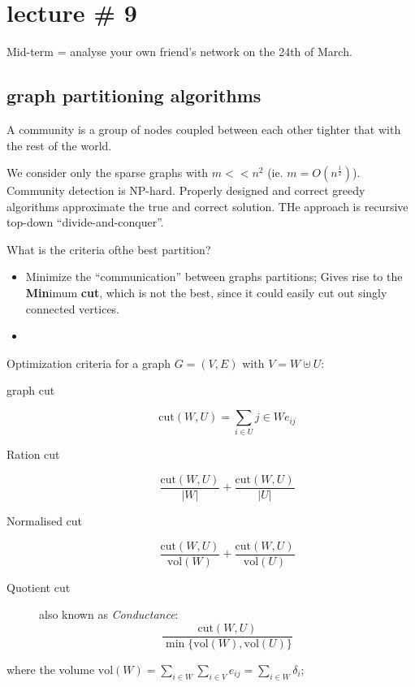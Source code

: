 \documentclass[a4paper]{article}
\begin{document}



\section{lecture \# 9} %
\label{sec:lecture_9}

Mid-term = analyse your own friend's network on the 24th of March.

\subsection{graph partitioning algorithms} %
\label{sub:graph_partitioning_algorithms}

A community is a group of nodes coupled between each other tighter that with the rest of the world.

We consider only the sparse graphs with $m<<n^2$ (ie. $m = O(n^\frac{1}{2})$). Community detection is NP-hard.
Properly designed and correct greedy algorithms approximate the true and correct solution. THe approach is recursive top-down ``divide-and-conquer''.

What is the criteria ofthe best partition?\begin{itemize}
	\item Minimize the ``communication'' between graphs partitions; Gives rise to the \textbf{Min}imum \textbf{cut}, which is not the best, since it could easily cut out singly connected vertices.
	\item 
\end{itemize}

Optimization criteria for a graph $G=(V,E)$ with $V = W\uplus U$:
\begin{description}
	\item[graph cut] \[\text{cut}(W, U) = \sum_{i\in U}{j \in W}e_{ij}\]
	\item[Ration cut] \[\frac{\text{cut}(W, U)}{|W|}  + \frac{\text{cut}(W, U)}{|U|} \]
	\item[Normalised cut] \[\frac{\text{cut}(W, U)}{\text{vol}(W)}  + \frac{\text{cut}(W, U)}{\text{vol}(U)} \]
	\item[Quotient cut] also known as \emph{Conductance}: \[\frac{\text{cut}(W, U)}{\min\big\{\text{vol}(W),\text{vol}(U)\big\}} \]
\end{description}
where the volume $\text{vol}(W) = \sum_{i\in W} \sum_{i\in V} e_{ij} = \sum_{i\in W} \delta_i$;
\end{document}
